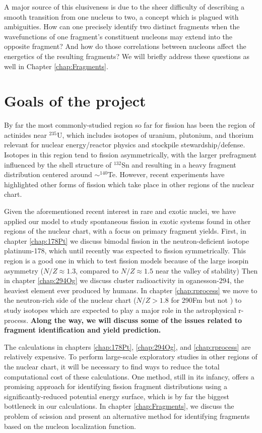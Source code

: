 A major source of this elusiveness is due to the sheer difficulty of describing a smooth transition from one nucleus to two, a concept which is plagued with ambiguities. How can one precisely identify two distinct fragments when the wavefunctions of one fragment’s constituent nucleons may extend into the opposite fragment? And how do those correlations between nucleons affect the energetics of the resulting fragments? We will briefly address these questions as well in Chapter \ref{chap:Fragments}.


\section{Goals of the project}
By far the most commonly-studied region so far for fission has been the region of actinides near $^{235}$U, which includes isotopes of uranium, plutonium, and thorium relevant for nuclear energy/reactor physics and stockpile stewardship/defense. Isotopes in this region tend to fission asymmetrically, with the larger prefragment influenced by the shell structure of $^{132}$Sn and resulting in a heavy fragment distribution centered around $\sim^{140}$Te. However, recent experiments have highlighted other forms of fission which take place in other regions of the nuclear chart.

Given the aforementioned recent interest in rare and exotic nuclei, we have applied our model to study spontaneous fission in exotic systems found in other regions of the nuclear chart, with a focus on primary fragment yields. First, in chapter \ref{chap:178Pt} we discuss bimodal fission in the neutron-deficient isotope platinum-178, which until recently was expected to fission symmetrically. This region is a good one in which to test fission models because of the large isospin asymmetry ($N/Z\approx1.3$, compared to $N/Z\approx1.5$ near the valley of stability) Then in chapter \ref{chap:294Og} we discuss cluster radioactivity in oganesson-294, the heaviest element ever produced by humans. In chapter \ref{chap:rprocess} we move to the neutron-rich side of the nuclear chart ($N/Z>1.8$ for 290Fm but not {\Cf}) to study isotopes which are expected to play a major role in the astrophysical r-process. \textbf{Along the way, we will discuss some of the issues related to fragment identification and yield prediction.}

The calculations in chapters \ref{chap:178Pt}, \ref{chap:294Og}, and \ref{chap:rprocess} are relatively expensive. To perform large-scale exploratory studies in other regions of the nuclear chart, it will be necessary to find ways to reduce the total computational cost of these calculations. One method, still in its infancy, offers a promising approach for identifying fission fragment distributions using a significantly-reduced potential energy surface, which is by far the biggest bottleneck in our calculations. In chapter \ref{chap:Fragments}, we discuss the problem of scission and present an alternative method for identifying fragments based on the nucleon localization function.


